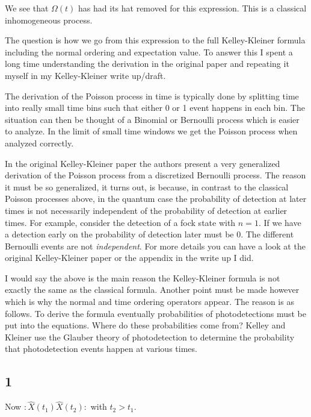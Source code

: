 \documentclass[12pt]{article}
\begin{document}
We see that $\Omega(t)$ has had its hat removed for this expression. This is a classical inhomogeneous process.

The question is how we go from this expression to the full Kelley-Kleiner formula including the normal ordering and expectation value. To answer this I spent a long time understanding the derivation in the original paper and repeating it myself in my Kelley-Kleiner write up/draft.

The derivation of the Poisson process in time is typically done by splitting time into really small time bins such that either 0 or 1 event happens in each bin. The situation can then be thought of a Binomial or Bernoulli process which is easier to analyze. In the limit of small time windows we get the Poisson process when analyzed correctly.

In the original Kelley-Kleiner paper the authors present a very generalized derivation of the Poisson process from a discretized Bernoulli process. The reason it must be so generalized, it turns out, is because, in contrast to the classical Poisson processes above, in the quantum case the probability of detection at later times is not necessarily independent of the probability of detection at earlier times. For example, consider the detection of a fock state with $n=1$. If we have a detection early on the probability of detection later must be 0. The different Bernoulli events are not \textit{independent}. For more details you can have a look at the original Kelley-Kleiner paper or the appendix in the write up I did.

I would say the above is the main reason the Kelley-Kleiner formula is not exactly the same as the classical formula. Another point must be made however which is why the normal and time ordering operators appear. The reason is as follows. To derive the formula eventually probabilities of photodetections must be put into the equations. Where do these probabilities come from? Kelley and Kleiner use the Glauber theory of photodetection to determine the probability that photodetection events happen at various times.






\pagebreak

\subsection{1}

Now $:\hat{X}(t_1)\hat{X}(t_2):$ with $t_2>t_1$.
\end{document}
